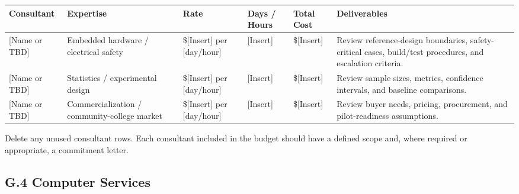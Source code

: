 \documentclass[11pt,letterpaper]{article}
\begin{document}
\begin{table}[htbp]
\centering
\renewcommand{\arraystretch}{1.25}
\begin{tabularx}{\textwidth}{
    p{}
    p{}
    p{}
    p{}
    p{}
    X
}
\toprule
\textbf{Consultant} &
\textbf{Expertise} &
\textbf{Rate} &
\textbf{Days / Hours} &
\textbf{Total Cost} &
\textbf{Deliverables} \\
\midrule

[Name or TBD] &
Embedded hardware / electrical safety &
\$[Insert] per [day/hour] &
[Insert] &
\$[Insert] &
Review reference-design boundaries, safety-critical cases, build/test
procedures, and escalation criteria. \\

[Name or TBD] &
Statistics / experimental design &
\$[Insert] per [day/hour] &
[Insert] &
\$[Insert] &
Review sample sizes, metrics, confidence intervals, and baseline comparisons. \\

[Name or TBD] &
Commercialization / community-college market &
\$[Insert] per [day/hour] &
[Insert] &
\$[Insert] &
Review buyer needs, pricing, procurement, and pilot-readiness assumptions. \\

\bottomrule
\end{tabularx}
\end{table}

\noindent
Delete any unused consultant rows. Each consultant included in the budget
should have a defined scope and, where required or appropriate, a commitment
letter.

\subsection*{G.4 Computer Services}
\end{document}
